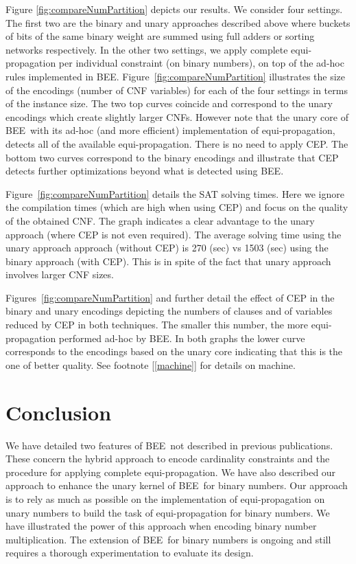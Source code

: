 \documentclass[runningheads,a4paper]{llncs}
\newcommand{\bee}{\textsf{BEE}}
\begin{document}
Figure \ref{fig:compareNumPartition} depicts our results. We consider
four settings. The first two are the binary and unary approaches
described above where buckets of bits of the same binary weight are
summed using full adders or sorting networks respectively. In the
other two settings, we apply complete equi-propagation per individual
constraint (on binary numbers), on top of the ad-hoc rules implemented
in \bee.
Figure~\ref{fig:compareNumPartition} illustrates the size
of the encodings (number of CNF variables) for each of the four
settings in terms of the instance size. The two top curves coincide
and correspond to the unary encodings which create slightly larger
CNFs. However note that the unary core of \bee\ with its ad-hoc (and
more efficient) implementation of equi-propagation, detects all of the
available equi-propagation. There is no need to apply CEP. The bottom
two curves correspond to the binary encodings and illustrate that CEP
detects further optimizations beyond what is detected using \bee.

Figure~\ref{fig:compareNumPartition} details the SAT
solving times. Here we ignore the compilation times (which are high
when using CEP) and focus on the quality of the obtained CNF. The
graph indicates a clear advantage to the unary approach (where CEP
is not even required).
The average solving time using the unary approach approach (without
CEP) is 270 (sec) vs 1503 (sec) using the binary approach (with
CEP). This is in spite of the fact that unary approach involves larger
CNF sizes.

Figures~\ref{fig:compareNumPartition} and 
further detail the effect of CEP in the binary and unary encodings
depicting the numbers of clauses and of variables reduced by CEP in
both techniques. The smaller this number, the more equi-propagation
performed ad-hoc by \bee.
In both graphs the lower curve corresponds to the encodings based on
the unary core indicating that this is the one of better quality. See
footnote [\ref{machine}] for details on machine.





\section{Conclusion}

We have detailed two features of \bee\ not described in previous
publications. These concern the hybrid approach to encode cardinality
constraints and the procedure for applying complete
equi-propagation. We have also described our approach to enhance the
unary kernel of \bee\ for binary numbers. Our approach is to rely as
much as possible on the implementation of equi-propagation on unary
numbers to build the task of equi-propagation for binary numbers. We
have illustrated the power of this approach when encoding binary
number multiplication. The extension of \bee\ for binary numbers is
ongoing and still requires a thorough experimentation to evaluate its
design.
\end{document}

